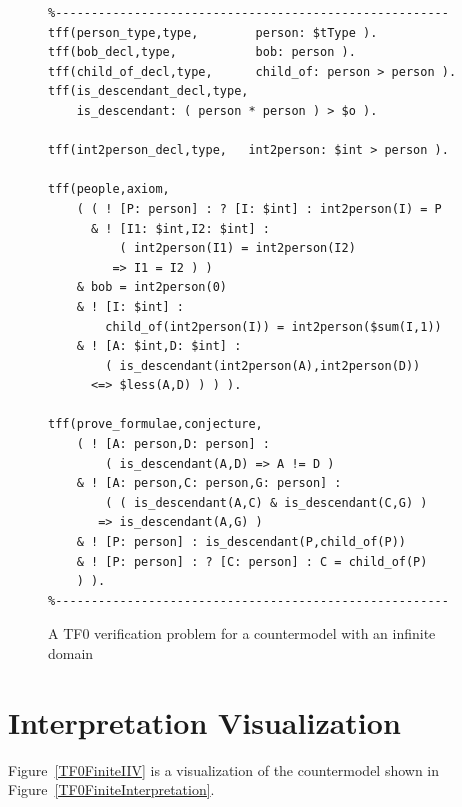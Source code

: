 \documentclass[letterpaper]{article}
\begin{document}
\begin{figure}[htbp]
\scriptsize
{}
\begin{verbatim}
%-------------------------------------------------------
tff(person_type,type,        person: $tType ).
tff(bob_decl,type,           bob: person ).
tff(child_of_decl,type,      child_of: person > person ).
tff(is_descendant_decl,type, 
    is_descendant: ( person * person ) > $o ).

tff(int2person_decl,type,   int2person: $int > person ).

tff(people,axiom,
    ( ( ! [P: person] : ? [I: $int] : int2person(I) = P
      & ! [I1: $int,I2: $int] : 
          ( int2person(I1) = int2person(I2) 
         => I1 = I2 ) )
    & bob = int2person(0)
    & ! [I: $int] : 
        child_of(int2person(I)) = int2person($sum(I,1))
    & ! [A: $int,D: $int] : 
        ( is_descendant(int2person(A),int2person(D)) 
      <=> $less(A,D) ) ) ).

tff(prove_formulae,conjecture,
    ( ! [A: person,D: person] : 
        ( is_descendant(A,D) => A != D )
    & ! [A: person,C: person,G: person] :
        ( ( is_descendant(A,C) & is_descendant(C,G) )
       => is_descendant(A,G) )
    & ! [P: person] : is_descendant(P,child_of(P))
    & ! [P: person] : ? [C: person] : C = child_of(P) 
    ) ).
%-------------------------------------------------------
\end{verbatim}
\caption{A TF0 verification problem for a countermodel with an infinite domain}
\label{TF0InfiniteVerification}
\end{figure}

\section{Interpretation Visualization}
\label{Visualization}

Figure~\ref{TF0FiniteIIV} is a visualization of the countermodel shown in 
Figure~\ref{TF0FiniteInterpretation}.
\end{document}
